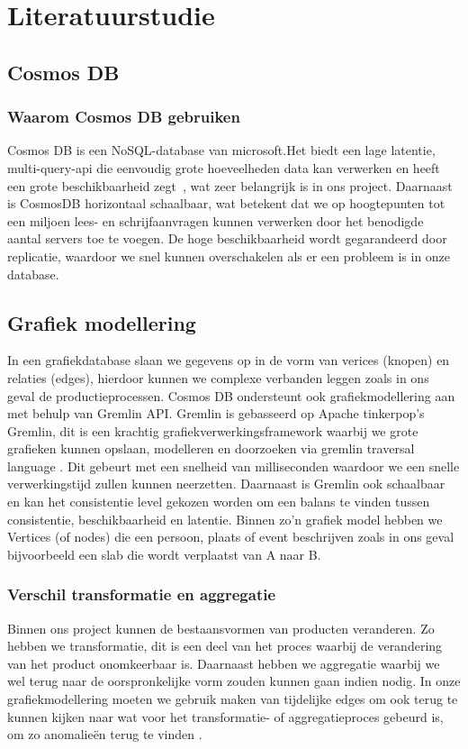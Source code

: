 \section{Literatuurstudie}%
\label{sec:literatuurstudie}

\subsection{Cosmos DB}%
\subsubsection{Waarom Cosmos DB gebruiken}
Cosmos DB is een NoSQL-database van microsoft.Het biedt een lage latentie, multi-query-api die eenvoudig grote hoeveelheden data kan verwerken en heeft een grote beschikbaarheid zegt~\textcite{Put2020}, wat zeer belangrijk is in ons project.
Daarnaast is CosmosDB horizontaal schaalbaar, wat betekent dat we op hoogtepunten tot een miljoen lees- en schrijfaanvragen kunnen verwerken door het benodigde aantal servers toe te voegen.
De hoge beschikbaarheid wordt gegarandeerd door replicatie, waardoor we snel kunnen overschakelen als er een probleem is in onze database.

\subsection{Grafiek modellering}
In een grafiekdatabase slaan we gegevens op in de vorm van verices (knopen) en relaties (edges), hierdoor kunnen we complexe verbanden leggen zoals in ons geval de productieprocessen.
Cosmos DB ondersteunt ook grafiekmodellering aan met behulp van Gremlin API. Gremlin is gebasseerd op Apache tinkerpop's Gremlin, dit is een krachtig grafiekverwerkingsframework waarbij we grote grafieken kunnen opslaan, modelleren en doorzoeken via gremlin traversal language \autocite{Microsoft2024}.
Dit gebeurt met een snelheid van milliseconden waardoor we een snelle verwerkingstijd zullen kunnen neerzetten.
Daarnaast is Gremlin ook schaalbaar en kan het consistentie level gekozen worden om een balans te vinden tussen consistentie, beschikbaarheid en latentie.
Binnen zo'n grafiek model hebben we Vertices (of nodes) die een persoon, plaats of event beschrijven zoals in ons geval bijvoorbeeld een slab die wordt verplaatst van A naar B.

\subsubsection{Verschil transformatie en aggregatie}
Binnen ons project kunnen de bestaansvormen van producten veranderen. Zo hebben we transformatie, dit is een deel van het proces waarbij de verandering van het product onomkeerbaar is.
Daarnaast hebben we aggregatie waarbij we wel terug naar de oorspronkelijke vorm zouden kunnen gaan indien nodig.
In onze grafiekmodellering moeten we gebruik maken van tijdelijke edges om ook terug te kunnen kijken naar wat voor het transformatie- of aggregatieproces gebeurd is, om zo anomalieën terug te vinden \autocite{JaewookByun2020}.

